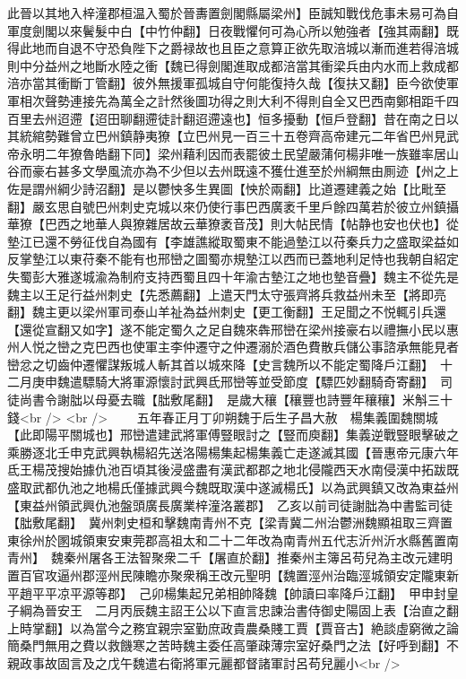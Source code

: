此晉以其地入梓潼郡桓温入蜀於晉夀置劍閣縣屬梁州】臣誠知戰伐危事未易可為自軍度劍閣以來鬢髮中白【中竹仲翻】日夜戰懼何可為心所以勉強者【強其兩翻】既得此地而自退不守恐負陛下之爵禄故也且臣之意算正欲先取涪城以漸而進若得涪城則中分益州之地斷水陸之衝【魏已得劍閣進取成都涪當其衝梁兵由内水而上救成都涪亦當其衝斷丁管翻】彼外無援軍孤城自守何能復持久哉【復扶又翻】臣今欲使軍軍相次聲勢連接先為萬全之計然後圖功得之則大利不得則自全又巴西南鄭相距千四百里去州迢遰【迢田聊翻遰徒計翻迢遰遠也】恒多擾動【恒戶登翻】昔在南之日以其統綰勢難曾立巴州鎮静夷獠【立巴州見一百三十五卷齊高帝建元二年省巴州見武帝永明二年獠魯皓翻下同】梁州藉利因而表罷彼土民望嚴蒲何楊非唯一族雖率居山谷而豪右甚多文學風流亦為不少但以去州既遠不獲仕進至於州綱無由厠迹【州之上佐是謂州綱少詩沼翻】是以鬱怏多生異圖【怏於兩翻】比道遷建義之始【比毗至翻】嚴玄思自號巴州刺史克城以來仍使行事巴西廣袤千里戶餘四萬若於彼立州鎮攝華獠【巴西之地華人與獠雜居故云華獠袤音茂】則大帖民情【帖静也安也伏也】從墊江已還不勞征伐自為國有【李雄譙縱取蜀東不能過墊江以苻秦兵力之盛取梁益如反掌墊江以東苻秦不能有也邢巒之圖蜀亦規墊江以西而已蓋地利足恃也我朝自紹定失蜀彭大雅遂城渝為制府支持西蜀且四十年渝古墊江之地也墊音疊】魏主不從先是魏主以王足行益州刺史【先悉薦翻】上遣天門太守張齊將兵救益州未至【將即亮翻】魏主更以梁州軍司泰山羊祉為益州刺史【更工衡翻】王足聞之不悦輒引兵還【還從宣翻又如字】遂不能定蜀久之足自魏來犇邢巒在梁州接豪右以禮撫小民以惠州人悦之巒之克巴西也使軍主李仲遷守之仲遷溺於酒色費散兵儲公事諮承無能見者巒忿之切齒仲遷懼謀叛城人斬其首以城來降【史言魏所以不能定蜀降戶江翻】　十二月庚申魏遣驃騎大將軍源懷討武興氐邢巒等並受節度【驃匹妙翻騎奇寄翻】　司徒尚書令謝朏以母憂去職【朏敷尾翻】　是歲大穰【穰豐也詩豐年穰穰】米斛三十錢<br />
<br />
　　五年春正月丁卯朔魏于后生子昌大赦　楊集義圍魏關城【此即陽平關城也】邢巒遣建武將軍傅豎眼討之【豎而庾翻】集義逆戰豎眼擊破之乘勝逐北壬申克武興執楊紹先送洛陽楊集起楊集義亡走遂滅其國【晉惠帝元康六年氐王楊茂搜始據仇池百頃其後浸盛盡有漢武都郡之地北侵隴西天水南侵漢中拓跋既盛取武都仇池之地楊氏僅據武興今魏既取漢中遂滅楊氏】以為武興鎮又改為東益州【東益州領武興仇池盤頭廣長廣業梓潼洛叢郡】　乙亥以前司徒謝朏為中書監司徒【朏敷尾翻】　冀州刺史桓和擊魏南青州不克【梁青冀二州治鬱洲魏顯祖取三齊置東徐州於圂城領東安東莞郡高祖太和二十二年改為南青州五代志沂州沂水縣舊置南青州】　魏秦州屠各王法智聚衆二千【屠直於翻】推秦州主簿呂苟兒為主改元建明置百官攻逼州郡涇州民陳瞻亦聚衆稱王改元聖明【魏置涇州治臨涇城領安定隴東新平趙平平凉平源等郡】　己卯楊集起兄弟相帥降魏【帥讀曰率降戶江翻】　甲申封皇子綱為晉安王　二月丙辰魏主詔王公以下直言忠諫治書侍御史陽固上表【治直之翻上時掌翻】以為當今之務宜親宗室勤庶政貴農桑賤工賈【賈音古】絶談虛窮微之論簡桑門無用之費以救饑寒之苦時魏主委任高肇疎薄宗室好桑門之法【好呼到翻】不親政事故固言及之戊午魏遣右衛將軍元麗都督諸軍討呂苟兒麗小<br />
